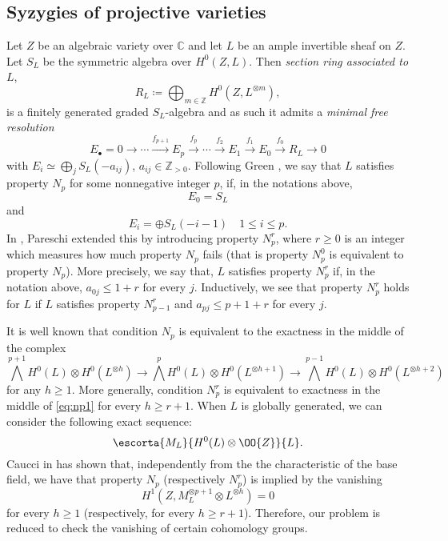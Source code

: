 \documentclass[11pt,letter]{amsart}
\numberwithin{equation}{section}
\begin{document}
\subsection{Syzygies of projective varieties}\label{sub:N_P}
Let $Z$ be an algebraic variety over $\mathbb{C}$ and let $L$ be an ample
invertible sheaf on $Z$. Let $S_L$ be the symmetric algebra over $H^0(Z,L)$. Then \textit{section ring associated to  $L$},
\[R_L\coloneqq \bigoplus_{m\in\mathbb{Z}}H^{0}({Z},{L^{
\otimes m}}),\]
is a finitely generated graded $S_L$-algebra and as such it admits a \textit{minimal free
resolution} 
\begin{equation}\label{minalfree}
E_\bullet = 0\rightarrow\cdots\xrightarrow{f_{p+1}}
E_p\xrightarrow{f_p}\cdots\xrightarrow{f_2} E_1\xrightarrow{f_1}
E_0\xrightarrow{f_0}R_L\rightarrow 0
\end{equation}
with  $E_i\simeq\bigoplus_j S_L(-a_{ij})$, $a_{ij}\in\mathbb  Z_{>0}$.
Following Green \cite{green1984koszul},  we say that $L$ satisfies
property $N_p$ for some nonnegative integer $p$, if, in the notations above,
$$E_0=S_L%
$$
and
$$E_i=\oplus S_L(-i-1)\quad 1\leq i\leq p.$$
In \cite{pareschi2000syzygies}, Pareschi  extended this by introducing property $N_p^r$, where $r\geq 0$ is an integer which measures how much property $N_p$ fails (that is property $N_p^0$ is equivalent to property $N_p$). More precisely, we say that, $L$ satisfies property $N_p^r$ if, in the notation above, $a_{0j}\leq 1+r$ for
every $j$. Inductively, we see that property $N_p^r$ holds for $L$ if $L$ satisfies  property $N_{p-1}^r$ and $a_{pj}\leq p+1+r$ for every $j$.\par
 It is well known that condition $N_p$ is equivalent to the exactness in the middle of the complex
\begin{equation}\label{eq:np1}
 \bigwedge^{p+1}H^0(L)\otimes H^0(L^{\otimes h})\rightarrow \bigwedge^{p}H^0(L)\otimes H^0(L^{\otimes
h+1})\rightarrow \bigwedge^{p-1}H^0(L)\otimes H^0(L^{\otimes h+2})
\end{equation}
for any $h\geq 1$. More  generally, condition $N_p^r$ is equivalent to exactness in the middle of
\eqref{eq:np1} for every $h\geq r+1$. When $L$ is globally generated, we can consider the following exact sequence:
\begin{equation}
 \escorta{M_L}{H^0(L)\otimes\OO{Z}}{L}.
\end{equation}
Caucci in \cite[Prop.4.1]{Caucci} has shown that, independently from the the characteristic of the base field, we have that property $N_p$ (respectively $N_p^r$) is implied by the vanishing 
\begin{equation}\label{importan vanishing}
    H^1(Z,M_{L}^{\otimes p+1}\otimes L^{\otimes h})=0
\end{equation}
for every $h\geq 1$ (respectively, for every $h\geq r+1$). Therefore, our problem is reduced to check the vanishing of certain cohomology groups.
\end{document}

